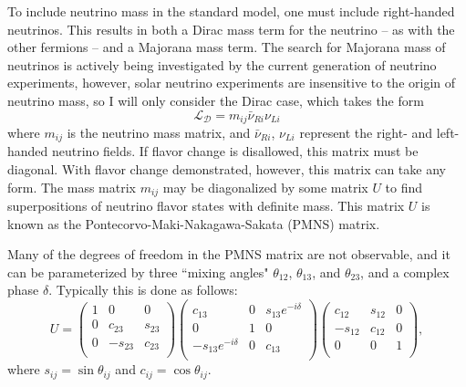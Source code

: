 To include neutrino mass in the standard model, one must include right-handed neutrinos.
This results in both a Dirac mass term for the neutrino -- as with the other fermions -- and a Majorana mass term.
The search for Majorana mass of neutrinos is actively being investigated by the current generation of neutrino experiments, however, solar neutrino experiments are insensitive to the origin of neutrino mass, so I will only consider the Dirac case, which takes the form
\begin{equation}
\mathscr{L_D} = m_{ij} \bar{\nu}_{Ri} \nu_{Li} 
\end{equation}
where $m_{ij}$ is the neutrino mass matrix, and $\bar{\nu}_{Ri}$, $\nu_{Li}$ represent the right- and left-handed neutrino fields.
If flavor change is disallowed, this matrix must be diagonal.
With flavor change demonstrated, however, this matrix can take any form.
The mass matrix $m_{ij}$ may be diagonalized by some matrix $U$ to find superpositions of neutrino flavor states with definite mass.
This matrix $U$ is known as the Pontecorvo-Maki-Nakagawa-Sakata (PMNS) matrix.

Many of the degrees of freedom in the PMNS matrix are not observable, and it can be parameterized by three ``mixing angles" $\theta_{12}$, $\theta_{13}$, and $\theta_{23}$, and a complex phase $\delta$.
Typically this is done as follows:
\begin{equation}
U = 
\left(
\begin{array}{ccc}
1 & 0        & 0\\
0 & c_{23}   & s_{23}\\
0 & -s_{23}  & c_{23}\\
\end{array}
\right)
\left(
\begin{array}{ccc}
c_{13}              & 0  & s_{13}e^{-i\delta} \\
0                   & 1  & 0                  \\
-s_{13}e^{-i\delta} & 0  & c_{13}             \\
\end{array}
\right)
\left(
\begin{array}{ccc}
c_{12}  & s_{12} & 0 \\
-s_{12} & c_{12} & 0 \\
0       & 0      & 1 \\
\end{array}
\right),
\end{equation}
where $s_{ij} = \sin{\theta_{ij}}$ and $c_{ij} = \cos{\theta_{ij}}$.


